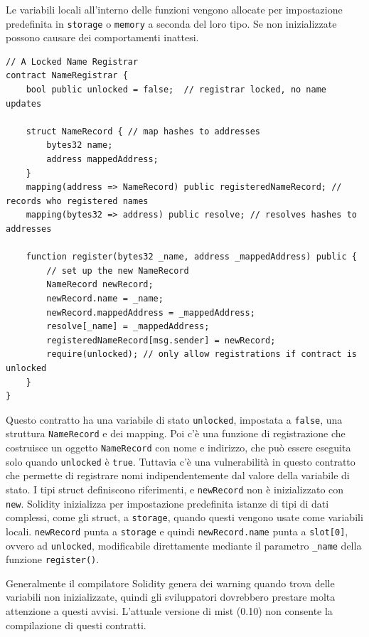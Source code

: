 Le variabili locali all'interno delle funzioni vengono allocate per impostazione predefinita in \texttt{storage} o \texttt{memory} a seconda del loro tipo. Se non inizializzate possono causare dei comportamenti inattesi.
\begin{lstlisting}[language=Solidity]
// A Locked Name Registrar
contract NameRegistrar {
    bool public unlocked = false;  // registrar locked, no name updates
    
    struct NameRecord { // map hashes to addresses
        bytes32 name;  
        address mappedAddress;
    }
    mapping(address => NameRecord) public registeredNameRecord; // records who registered names 
    mapping(bytes32 => address) public resolve; // resolves hashes to addresses
    
    function register(bytes32 _name, address _mappedAddress) public {
        // set up the new NameRecord
        NameRecord newRecord;
        newRecord.name = _name;
        newRecord.mappedAddress = _mappedAddress; 
        resolve[_name] = _mappedAddress;
        registeredNameRecord[msg.sender] = newRecord; 
        require(unlocked); // only allow registrations if contract is unlocked
    }
}
\end{lstlisting}
Questo contratto ha una variabile di stato \texttt{unlocked}, impostata a \texttt{false}, una struttura \texttt{NameRecord} e dei mapping. Poi c'è una funzione di registrazione che costruisce un oggetto \texttt{NameRecord} con nome e indirizzo, che può essere eseguita solo quando \texttt{unlocked} è \texttt{true}. 
Tuttavia c'è una vulnerabilità in questo contratto che permette di registrare nomi indipendentemente dal valore della variabile di stato. I tipi struct definiscono riferimenti, e \texttt{newRecord} non è inizializzato con \texttt{new}. Solidity inizializza per impostazione predefinita istanze di tipi di dati complessi, come gli struct, a \texttt{storage}, quando questi vengono usate come variabili locali. \texttt{newRecord} punta a \texttt{storage} e quindi \texttt{newRecord.name} punta a \texttt{slot[0]}, ovvero ad \texttt{unlocked}, modificabile direttamente mediante il parametro \texttt{\_name} della funzione \texttt{register()}.

Generalmente il compilatore Solidity genera dei warning quando trova delle variabili non inizializzate, quindi gli sviluppatori dovrebbero prestare molta attenzione a questi avvisi. L'attuale versione di mist (0.10) non consente la compilazione di questi contratti.

\vspace{5mm}

